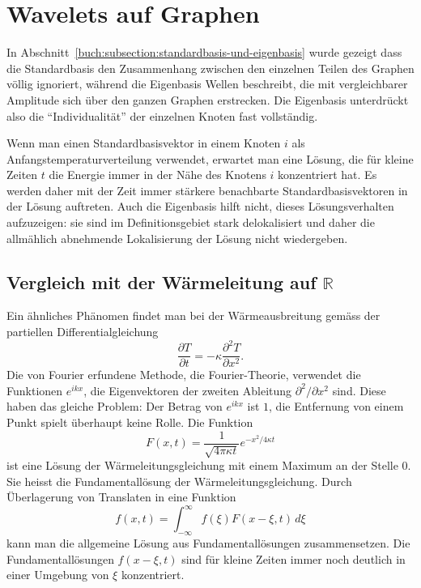 %
%
%
\section{Wavelets auf Graphen
\label{buch:section:wavelets-auf-graphen}}
In Abschnitt~\ref{buch:subsection:standardbasis-und-eigenbasis} wurde
gezeigt dass die Standardbasis den Zusammenhang zwischen den einzelnen
Teilen des Graphen völlig ignoriert, während die Eigenbasis Wellen
beschreibt, die mit vergleichbarer Amplitude sich über den ganzen
Graphen erstrecken.
Die Eigenbasis unterdrückt also die ``Individualität'' der einzelnen
Knoten fast vollständig.

Wenn man einen Standardbasisvektor in einem Knoten $i$
als Anfangstemperaturverteilung verwendet, erwartet man eine Lösung,
die für kleine Zeiten $t$ die Energie immer in der Nähe des Knotens $i$
konzentriert hat.
Es werden daher mit der Zeit immer stärkere benachbarte Standardbasisvektoren
in der Lösung auftreten.
Auch die Eigenbasis hilft nicht, dieses Lösungsverhalten aufzuzeigen:
sie sind im Definitionsgebiet stark delokalisiert und daher die allmählich
abnehmende Lokalisierung der Lösung nicht wiedergeben.

\subsection{Vergleich mit der Wärmeleitung auf $\mathbb{R}$}
Ein ähnliches Phänomen findet man bei der Wärmeausbreitung gemäss
der partiellen Differentialgleichung
\[
\frac{\partial T}{\partial t} = -\kappa \frac{\partial^2 T}{\partial x^2}.
\]
Die von Fourier erfundene Methode, die Fourier-Theorie, verwendet die
Funktionen $e^{ik x}$, die Eigenvektoren der zweiten Ableitung
$\partial^2/\partial x^2$ sind.
Diese haben das gleiche Problem: Der Betrag von $e^{ikx}$ ist $1$, die
Entfernung von einem Punkt spielt überhaupt keine Rolle.
Die Funktion
\[
F(x,t)
=
\frac{1}{\sqrt{4\pi\kappa t}}e^{-x^2/4\kappa t}
\]
ist eine Lösung der Wärmeleitungsgleichung mit einem Maximum an
der Stelle $0$.
Sie heisst die Fundamentallösung der Wärmeleitungsgleichung.
Durch Überlagerung von Translaten in eine Funktion
\begin{equation}
f(x,t)
=
\int_{-\infty}^\infty f(\xi) F(x-\xi,t)\,d\xi
\label{buch:graphen:eqn:fundamentalueberlagerung}
\end{equation}
kann man die allgemeine Lösung aus Fundamentallösungen zusammensetzen.
Die Fundamentallösungen $f(x-\xi,t)$ sind für kleine Zeiten immer noch
deutlich in einer Umgebung von $\xi$ konzentriert.

